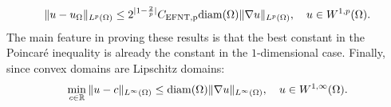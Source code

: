 \documentclass[a4paper]{article}
\begin{document}
\begin{align}\label{math:esposito:poincare}
    \| u - u_{\Omega} \|_{L^{p}(\Omega)}
    \leq 
    2^{|1-\frac 2 p|}C_{\rm{EFNT},p}
    {\operatorname{diam}}(\Omega)
    \| \nabla u \|_{L^{p}(\Omega)}
    ,
    \quad 
    u \in W^{1,p}(\Omega)
    .
\end{align}
The main feature in proving these results is that the best constant in the Poincar\'e inequality is already the constant in the $1$-dimensional case. 
Finally, since convex domains are Lipschitz domains: 
\begin{align}\label{math:lipschitzestimate}
    \min\limits_{ c \in {\mathbb R} }
    \| u - c \|_{L^{\infty}(\Omega)}
    \leq 
    {\operatorname{diam}}(\Omega)
    \| \nabla u \|_{L^{\infty}(\Omega)}
    ,
    \quad 
    u \in W^{1,\infty}(\Omega)
    .
\end{align}
\end{document}
